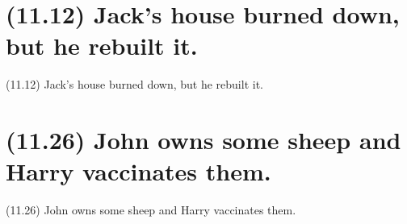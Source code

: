 \documentclass{article}
\begin{document}
\clearpage

%
%

\section*{(11.12) Jack's house burned down, but he rebuilt it.}

\bigbreak
\begin{enumerate*}
\item[(11.12)] Jack's house burned down, but he rebuilt it.
\end{enumerate*}
\bigbreak

\bigbreak
\begin{minipage}{\textwidth}
\end{minipage}
\bigbreak

\clearpage

%
%

\section*{(11.26) John owns some sheep and Harry vaccinates them.}

\bigbreak
\begin{enumerate*}
\item[(11.26)] John owns some sheep and Harry vaccinates them.
\end{enumerate*}
\bigbreak

\bigbreak
\begin{minipage}{\textwidth}
\end{minipage}
\bigbreak
\end{document}

